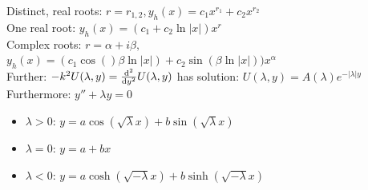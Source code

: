 \documentclass{article}
\theoremstyle{definition}
\begin{document}
\begin{multicols}{3}
Distinct, real roots: $r = r_{1,2}, y_h(x) = c_1 x^{r_1}  + c_2 x^{r_2}$\\
One real root: $y_h(x) = (c_1 + c_2 \ln |x| )x^r$\\
Complex roots: $r = \alpha + i \beta,$ $y_h(x) = (c_1 \cos ()\beta \ln |x|) + c_2 \sin (\beta \ln |x|))x^\alpha$\\
Further:
$-k^2U(\lambda, y) = \dv{^2}{y^2}U(\lambda,y)$
has solution:
$U(\lambda,y) = A(\lambda)e^{-|\lambda|y}$
Furthermore:
$y'' + \lambda y = 0$
\begin{itemize}
	\item $\lambda>0$: $y = a \cos (\sqrt{\lambda}x) + b \sin (\sqrt{\lambda}x) $
	\item $\lambda = 0$: $y = a + b x$
	\item $ \lambda < 0$: $y = a \cosh (\sqrt{-\lambda}x) + b \sinh (\sqrt{-\lambda}x) $
\end{itemize}

\end{multicols}
\end{document}
